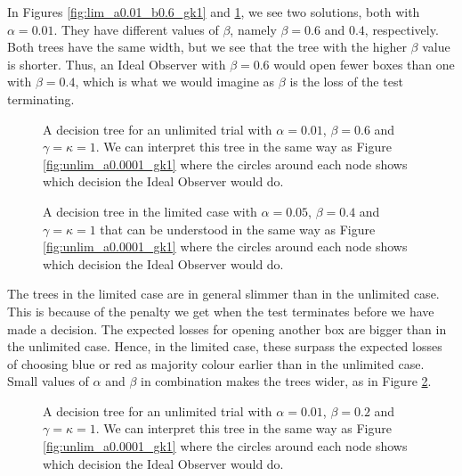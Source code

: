 In Figures \ref{fig:lim_a0.01_b0.6_gk1} and \ref{fig:lim_a0.01_b0.4_gk1}, we see two solutions, both with $\alpha=0.01$. They have different values of $\beta$, namely $\beta=0.6$ and $0.4$, respectively. Both trees have the same width, but we see that the tree with the higher $\beta$ value is shorter. Thus, an Ideal Observer with $\beta=0.6$ would open fewer boxes than one with $\beta=0.4$, which is what we would imagine as $\beta$ is the loss of the test terminating. 
\begin{figure}
    \centering
    \begin{minipage}[t]{0.45\textwidth}
        \centering
        \scalebox{0.6}{}
        \caption[IO solution, limited. $\alpha=0.01$, $\beta=0.6$ and $\gamma=\kappa=1$]{A decision tree for an unlimited trial with $\alpha = 0.01$, $\beta=0.6$ and $\gamma=\kappa=1$.
        We can interpret this tree in the same way as Figure \ref{fig:unlim_a0.0001_gk1} where the circles around each node shows which decision the Ideal Observer would do.}
        \label{fig:lim_a0.01_b0.6_gk1}
    \end{minipage}\hfill
    \begin{minipage}[t]{0.45\textwidth}
        \centering
        \scalebox{0.6}{}
        \caption[IO solution, limited. $\alpha=0.01$, $\beta=0.4$ and $\gamma=\kappa=1$]{A decision tree in the limited case with $\alpha = 0.05$, $\beta=0.4$ and $\gamma=\kappa=1$ that can be understood in the same way as Figure \ref{fig:unlim_a0.0001_gk1} where the circles around each node shows which decision the Ideal Observer would do.}
        \label{fig:lim_a0.01_b0.4_gk1}
    \end{minipage}
\end{figure}


The trees in the limited case are in general slimmer than in the unlimited case. This is because of the penalty we get when the test terminates before we have made a decision. The expected losses for opening another box are bigger than in the unlimited case. Hence, in the limited case, these surpass the expected losses of choosing blue or red as majority colour earlier than in the unlimited case. Small values of $\alpha$ and $\beta$ in combination makes the trees wider, as in Figure \ref{fig:lim_a0.0001_b0.2_gk1}.
\begin{figure}
    \centering
    \scalebox{0.8}{}
    \caption[IO solution, limited. $\alpha=0.0001, \beta=0.2$. $\gamma=\kappa=1$.]{A decision tree for an unlimited trial with $\alpha = 0.01$, $\beta=0.2$ and $\gamma=\kappa=1$.
    We can interpret this tree in the same way as Figure \ref{fig:unlim_a0.0001_gk1} where the circles around each node shows which decision the Ideal Observer would do.}
    \label{fig:lim_a0.0001_b0.2_gk1}
\end{figure}

